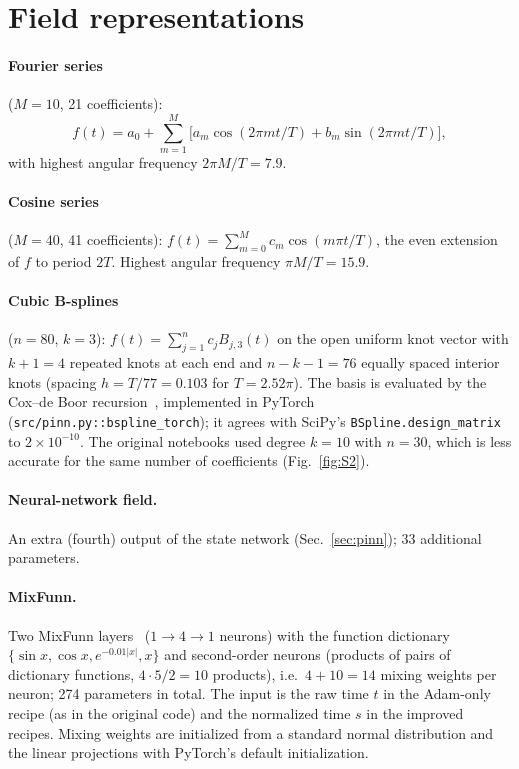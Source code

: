 \documentclass[aps,pra,onecolumn,superscriptaddress,11pt,longbibliography,floatfix,nofootinbib]{revtex4-2}
\begin{document}
\section{Field representations}\label{sec:representations}

\paragraph{Fourier series} ($M=10$, 21 coefficients):
\begin{equation}
  f(t)=a_0+\sum_{m=1}^{M}\big[a_m\cos(2\pi mt/T)+b_m\sin(2\pi mt/T)\big],
\end{equation}
with highest angular frequency $2\pi M/T=7.9$.

\paragraph{Cosine series} ($M=40$, 41 coefficients): $f(t)=\sum_{m=0}^{M}c_m\cos(m\pi t/T)$, the even
extension of $f$ to period $2T$. Highest angular frequency $\pi M/T=15.9$.

\paragraph{Cubic B-splines} ($n=80$, $k=3$): $f(t)=\sum_{j=1}^{n}c_jB_{j,3}(t)$ on the open uniform knot
vector with $k+1=4$ repeated knots at each end and $n-k-1=76$ equally spaced interior knots (spacing
$h=T/77=0.103$ for $T=2.52\pi$). The basis is evaluated by the Cox--de Boor
recursion~\cite{deboor2001splines}, implemented in PyTorch (\texttt{src/pinn.py::bspline\_torch}); it
agrees with SciPy's \texttt{BSpline.design\_matrix} to $2\times10^{-10}$. The original notebooks used
degree $k=10$ with $n=30$, which is less accurate for the same number of coefficients (Fig.~\ref{fig:S2}).

\paragraph{Neural-network field.} An extra (fourth) output of the state network
(Sec.~\ref{sec:pinn}); 33 additional parameters.

\paragraph{MixFunn.} Two MixFunn layers~\cite{farias2025mixfunn} ($1\to4\to1$ neurons) with the function
dictionary $\{\sin x,\cos x,e^{-0.01|x|},x\}$ and second-order neurons (products of pairs of dictionary
functions, $4\cdot5/2=10$ products), i.e.\ $4+10=14$ mixing weights per neuron; 274 parameters in total.
The input is the raw time $t$ in the Adam-only recipe (as in the original code) and the normalized time
$s$ in the improved recipes. Mixing weights are initialized from a standard normal distribution and the
linear projections with PyTorch's default initialization.
\end{document}
